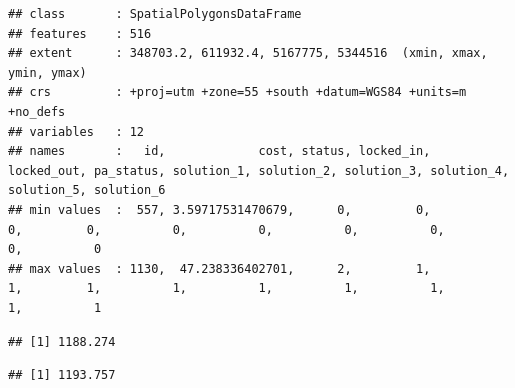 \documentclass[
  12pt,
]{book}
\newenvironment{Shaded}{\begin{snugshade}}{\end{snugshade}}
\newcommand{\CommentTok}[1]{\textcolor[rgb]{0.56,0.35,0.01}{\textit{#1}}}
\newcommand{\FunctionTok}[1]{\textcolor[rgb]{0.00,0.00,0.00}{#1}}
\newcommand{\NormalTok}[1]{#1}
\newcommand{\SpecialCharTok}[1]{\textcolor[rgb]{0.00,0.00,0.00}{#1}}
\begin{document}
\begin{verbatim}
## class       : SpatialPolygonsDataFrame 
## features    : 516 
## extent      : 348703.2, 611932.4, 5167775, 5344516  (xmin, xmax, ymin, ymax)
## crs         : +proj=utm +zone=55 +south +datum=WGS84 +units=m +no_defs 
## variables   : 12
## names       :   id,             cost, status, locked_in, locked_out, pa_status, solution_1, solution_2, solution_3, solution_4, solution_5, solution_6 
## min values  :  557, 3.59717531470679,      0,         0,          0,         0,          0,          0,          0,          0,          0,          0 
## max values  : 1130,  47.238336402701,      2,         1,          1,         1,          1,          1,          1,          1,          1,          1
\end{verbatim}

\begin{Shaded}
\end{Shaded}

\begin{verbatim}
## [1] 1188.274
\end{verbatim}

\begin{Shaded}
\end{Shaded}

\begin{verbatim}
## [1] 1193.757
\end{verbatim}

\begin{Shaded}
\end{Shaded}
\end{document}
